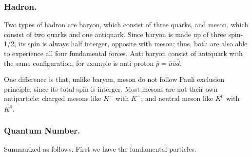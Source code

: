 \documentclass[../../../main.tex]{subfiles}
\begin{document}
\subsubsection*{Hadron.} Two types of hadron are baryon, which consist of three quarks, and meson, which consist of two quarks and one antiquark. Since baryon is made up of three spin-1/2, its spin is always half interger, opposite with meson; thus, both are also able to experience all four fundamental forces. Anti baryon consist of antiquark with the same configuration, for example is anti proton $\bar{p}=\bar{u}\bar{u}\bar{d}$.

One difference is that, unlike baryon, meson do not follow Pauli exclusion principle, since its total spin is interger. Most mesons are not their own antiparticle: charged mesons  like $K^+$ with $K^-$; and neutral meson like $K^0$ with $\bar{K^0}$.

\subsubsection*{Quantum Number.} Summarized as follows. First we have the fundamental particles. 
\end{document}

